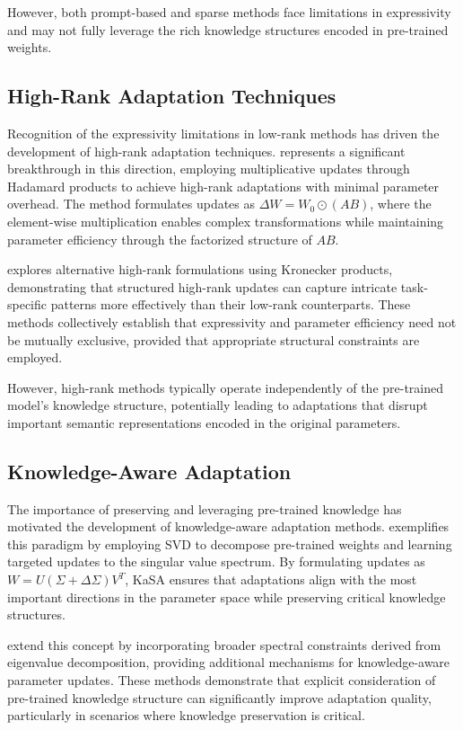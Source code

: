 \documentclass[10pt,letterpaper]{article}
\begin{document}
However, both prompt-based and sparse methods face limitations in expressivity and may not fully leverage the rich knowledge structures encoded in pre-trained weights.

\subsection{High-Rank Adaptation Techniques}

Recognition of the expressivity limitations in low-rank methods has driven the development of high-rank adaptation techniques. \citet{huang2024hira} represents a significant breakthrough in this direction, employing multiplicative updates through Hadamard products to achieve high-rank adaptations with minimal parameter overhead. The method formulates updates as $\Delta W = W_0 \odot (AB)$, where the element-wise multiplication enables complex transformations while maintaining parameter efficiency through the factorized structure of $AB$.

\citet{edalati2022krona} explores alternative high-rank formulations using Kronecker products, demonstrating that structured high-rank updates can capture intricate task-specific patterns more effectively than their low-rank counterparts. These methods collectively establish that expressivity and parameter efficiency need not be mutually exclusive, provided that appropriate structural constraints are employed.

However, high-rank methods typically operate independently of the pre-trained model's knowledge structure, potentially leading to adaptations that disrupt important semantic representations encoded in the original parameters.

\subsection{Knowledge-Aware Adaptation}

The importance of preserving and leveraging pre-trained knowledge has motivated the development of knowledge-aware adaptation methods. \citet{wang2024kasa} exemplifies this paradigm by employing SVD to decompose pre-trained weights and learning targeted updates to the singular value spectrum. By formulating updates as $W = U(\Sigma + \Delta\Sigma)V^T$, KaSA ensures that adaptations align with the most important directions in the parameter space while preserving critical knowledge structures.

\citet{chavan2023spectral} extend this concept by incorporating broader spectral constraints derived from eigenvalue decomposition, providing additional mechanisms for knowledge-aware parameter updates. These methods demonstrate that explicit consideration of pre-trained knowledge structure can significantly improve adaptation quality, particularly in scenarios where knowledge preservation is critical.
\end{document}
